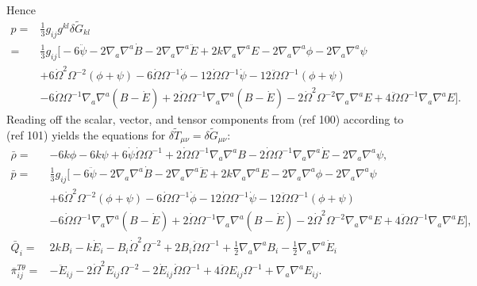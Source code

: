 \documentclass[10pt,letterpaper]{article}
\numberwithin{equation}{subsection}
\begin{document}
Hence
\begin{align}
p={}& \frac{1}{3}g_{ij}g^{kl} \delta \tilde G_{kl}
\nonumber\\
={}& \frac{1}{3}g_{ij} \bigg[ -6 \ddot \psi - 2 \nabla_a \nabla^a \dot B - 2 \nabla_a \nabla^a \ddot E + 2k \nabla_a \nabla^a E
-2\nabla_a \nabla^a\phi - 2\nabla_a \nabla^a\psi
\nonumber\\
& +6\dot \Omega^2 \Omega^{-2}(\phi+\psi) - 6\dot\Omega \Omega^{-1}\dot\phi - 12\dot\Omega \Omega^{-1} \dot\psi
-12 \ddot \Omega \Omega^{-1}( \phi + \psi) 
\nonumber\\
&-6\dot\Omega \Omega^{-1} \nabla_a\nabla^a (B-\dot E) + 2\dot\Omega \Omega^{-1} \nabla_a\nabla^a (B-\dot E)
-2\dot \Omega^2 \Omega^{-2} \nabla_a\nabla^a E + 4\ddot\Omega \Omega^{-1} \nabla_a\nabla^a E\bigg].
\end{align}
Reading off the scalar, vector, and tensor components from (ref 100) according to (ref 101) yields the equations for $\delta \tilde T_{\mu\nu} = \delta \tilde G_{\mu\nu}$:
\begin{align}
\bar \rho={}&-6 k \phi
 - 6 k \psi
 + 6 \dot{\psi} \dot{\Omega} \Omega^{-1}
 + 2 \dot{\Omega} \Omega^{-1} \nabla_{a}\nabla^{a}B
 - 2 \dot{\Omega} \Omega^{-1} \nabla_{a}\nabla^{a}\dot{E}
 - 2 \nabla_{a}\nabla^{a}\psi,
\nonumber\\
\bar p={}& \frac{1}{3}g_{ij} \bigg[ -6 \ddot \psi - 2 \nabla_a \nabla^a \dot B - 2 \nabla_a \nabla^a \ddot E + 2k \nabla_a \nabla^a E
-2\nabla_a \nabla^a\phi - 2\nabla_a \nabla^a\psi
\nonumber\\
& +6\dot \Omega^2 \Omega^{-2}(\phi+\psi) - 6\dot\Omega \Omega^{-1}\dot\phi - 12\dot\Omega \Omega^{-1} \dot\psi
-12 \ddot \Omega \Omega^{-1}( \phi + \psi) 
\nonumber\\
&-6\dot\Omega \Omega^{-1} \nabla_a\nabla^a (B-\dot E) + 2\dot\Omega \Omega^{-1} \nabla_a\nabla^a (B-\dot E)
-2\dot \Omega^2 \Omega^{-2} \nabla_a\nabla^a E + 4\ddot\Omega \Omega^{-1} \nabla_a\nabla^a E\bigg],
\nonumber\\
\bar Q_i={}& 2 k B_{i}
 -  k \dot{E}_{i}
 -  B_{i} \dot{\Omega}^2 \Omega^{-2}
 + 2 B_{i} \ddot{\Omega} \Omega^{-1}
 + \tfrac{1}{2} \nabla_{a}\nabla^{a}B_{i}
 -  \tfrac{1}{2} \nabla_{a}\nabla^{a}\dot{E}_{i}
\nonumber\\
\bar \pi_{ij}^{T\theta}={}&- \ddot{E}_{ij}
 - 2 \dot{\Omega}^2 E_{ij} \Omega^{-2}
 - 2 \dot{E}_{ij} \dot{\Omega} \Omega^{-1}
 + 4 \ddot{\Omega} E_{ij} \Omega^{-1}
 + \nabla_{a}\nabla^{a}E_{ij}.
\end{align}
\end{document}
